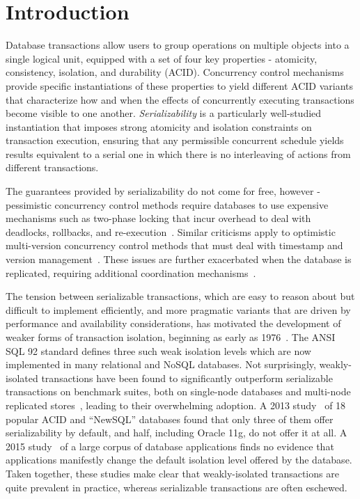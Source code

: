 
\section{Introduction}

Database transactions allow users to group operations on multiple
objects into a single logical unit, equipped with a set of four key
properties - atomicity, consistency, isolation, and durability (ACID).
Concurrency control mechanisms provide specific instantiations of
these properties to yield different ACID variants that characterize
how and when the effects of concurrently executing transactions become
visible to one another.  \emph{Serializability} is a particularly
well-studied instantiation that imposes strong atomicity and isolation
constraints on transaction execution, ensuring that any permissible
concurrent schedule yields results equivalent to a serial one in which
there is no interleaving of actions from different transactions.

The guarantees provided by serializability do not come for free,
however - pessimistic concurrency control methods require databases to
use expensive mechanisms such as two-phase locking that incur overhead
to deal with deadlocks, rollbacks, and
re-execution~\cite{twopl,ullmanbook}.  Similar criticisms apply to
optimistic multi-version concurrency control methods that must deal
with timestamp and version management~\cite{BG81}.  These issues are
further exacerbated when the database is replicated, requiring
additional coordination
mechanisms~\cite{cap,sernotavlbl,bailishat,bernsigmod13}.

The tension between serializable transactions, which are easy to
reason about but difficult to implement efficiently, and more
pragmatic variants that are driven by performance and availability
considerations, has motivated the development of weaker forms of
transaction isolation, beginning as early as 1976~\cite{gray1976}. The
ANSI SQL 92 standard defines three such weak isolation levels which
are now implemented in many relational and NoSQL databases. Not
surprisingly, weakly-isolated transactions have been found to
significantly outperform serializable transactions on benchmark
suites, both on single-node databases and multi-node replicated
stores~\cite{dbtuningbook,bailishat,bailisvldb}, leading to their
overwhelming adoption. A 2013 study~\cite{bailishotos} of 18 popular
ACID and ``NewSQL'' databases found that only three of them offer
serializability by default, and half, including Oracle 11g, do not
offer it at all.  A 2015 study~\cite{bailisferal} of a large corpus of
database applications finds no evidence that applications manifestly
change the default isolation level offered by the database. Taken
together, these studies make clear that weakly-isolated transactions
are quite prevalent in practice, whereas serializable transactions are
often eschewed.

